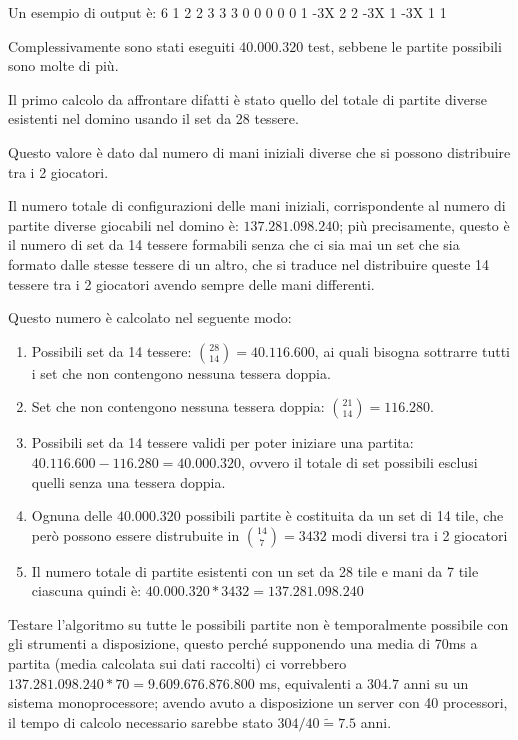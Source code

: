 \documentclass[a4paper,12pt]{report}
\begin{document}
Un esempio di output è: 6 1 2 2 3 3 3   0 0 0 0 0 1   \quad   -3X 2 2 -3X 1 -3X 1 1      

Complessivamente sono stati eseguiti \(40.000.320\) test, sebbene le partite possibili sono molte di più.

Il primo calcolo da affrontare difatti è stato quello del totale di partite diverse esistenti nel domino usando il set da 28 tessere.

Questo valore è dato dal numero di mani iniziali diverse che si possono distribuire tra i 2 giocatori.

Il numero totale di configurazioni delle mani iniziali, corrispondente al numero di partite diverse giocabili nel domino è: \(137.281.098.240\); più precisamente, questo è il numero di set da 14 tessere formabili senza che ci sia mai un set che sia formato dalle stesse tessere di un altro, che si traduce nel distribuire queste 14 tessere tra i 2 giocatori avendo sempre delle mani differenti.

Questo numero è calcolato nel seguente modo:

\begin{enumerate}
    \item Possibili set da 14 tessere: \(\binom{28}{14} = 40.116.600\), ai quali bisogna sottrarre tutti i set che non contengono nessuna tessera doppia.
    \item Set che non contengono nessuna tessera doppia: \(\binom{21}{14} = 116.280\).
    \item Possibili set da 14 tessere validi per poter iniziare una partita: \(40.116.600 - 116.280 = 40.000.320\), ovvero il totale di set possibili esclusi quelli senza una tessera doppia.
    \item Ognuna delle \(40.000.320\) possibili partite è costituita da un set di 14 tile, che però possono essere distrubuite in \(\binom{14}{7} = 3432\) modi diversi tra i 2 giocatori
    \item Il numero totale di partite esistenti con un set da 28 tile e mani da 7 tile ciascuna quindi è: \(40.000.320 * 3432 = 137.281.098.240\)
\end{enumerate}

Testare l'algoritmo su tutte le possibili partite non è temporalmente possibile con gli strumenti a disposizione, questo perché supponendo una media di 70ms a partita (media calcolata sui dati raccolti) ci vorrebbero \(137.281.098.240 * 70  = 9.609.676.876.800\) ms, equivalenti a \(304.7\) anni su un sistema monoprocessore; avendo avuto a disposizione un server con 40 processori, il tempo di calcolo necessario sarebbe stato \(304 / 40 \tilde= 7.5\) anni. 
\end{document}
